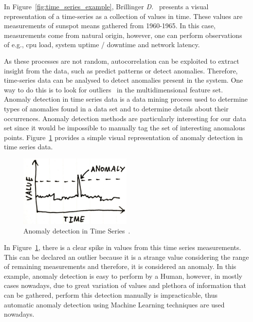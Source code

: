 In Figure~\ref{fig:time_series_example}, Brillinger \textit{D.}~\cite{Brillinger2006} presents a visual representation of a time-series as a collection of values in time. These values are measurements of sunspot means gathered from 1960-1965. In this case, measurements come from natural origin, however, one can perform observations of e.g., \gls{cpu} load, system uptime / downtime and network latency.

As these processes are not random, autocorrelation can be exploited to extract insight from the data, such as predict patterns or detect anomalies. Therefore, time-series data can be analysed to detect anomalies present in the system. One way to do this is to look for outliers~\cite{Liu2004} in the multidimensional feature set. Anomaly detection in time series data is a data mining process used to determine types of anomalies found in a data set and to determine details about their occurrences. Anomaly detection methods are particularly interesting for our data set since it would be impossible to manually tag the set of interesting anomalous points. Figure~\ref{fig:time_series_anomaly_detection_example} provides a simple visual representation of anomaly detection in time series data.

\begin{figure}[H]
    \centering
    \includegraphics[width=0.50\textwidth]{images/time_series_anomaly_detection_example.pdf}
    \caption{Anomaly detection in Time Series~\cite{NikolajBomannMertz}.}
    \label{fig:time_series_anomaly_detection_example}
\end{figure}

In Figure~\ref{fig:time_series_anomaly_detection_example}, there is a clear spike in values from this time series measurements. This can be declared an outlier because it is a strange value considering the range of remaining measurements and therefore, it is considered an anomaly. In this example, anomaly detection is easy to perform by a Human, however, in mostly cases nowadays, due to great variation of values and plethora of information that can be gathered, perform this detection manually is impracticable, thus automatic anomaly detection using Machine Learning techniques are used nowadays.

